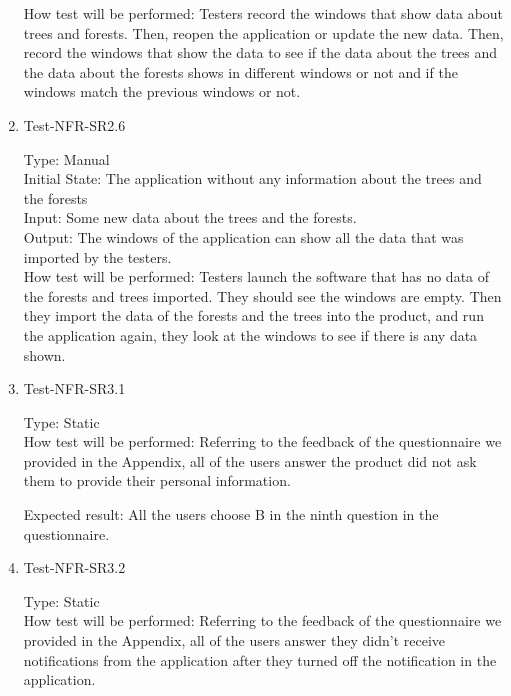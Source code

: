 \documentclass[12pt, titlepage]{article}
\begin{document}
\begin{enumerate}
How test will be performed: Testers record the windows that show data about trees and forests. Then, reopen the application or update the new data. Then, record the windows that show the data to see if the data about the trees and the data about the forests shows in different windows or not and if the windows match the previous windows or not. 

\item{Test-NFR-SR2.6\\}

Type: Manual\\

Initial State: The application without any information about the trees and the forests\\

Input: Some new data about the trees and the forests.\\

Output: The windows of the application can show all the data that was imported by the testers.\\

How test will be performed: Testers launch the software that has no data of the forests and trees imported. They should see the windows are empty. Then they import the data of the forests and the trees into the product, and run the application again, they look at the windows to see if there is any data shown.  

\item{Test-NFR-SR3.1\\}

Type: Static\\

How test will be performed: Referring to the feedback of the questionnaire we provided in the Appendix, all of the users answer the product did not ask them to provide their personal information.

Expected result: All the users choose B in the ninth question in the questionnaire.

\item{Test-NFR-SR3.2\\}

Type: Static\\

How test will be performed: Referring to the feedback of the questionnaire we provided in the Appendix, all of the users answer they didn't receive notifications from the application after they turned off the notification in the application.\\


\end{enumerate}
\end{document}
